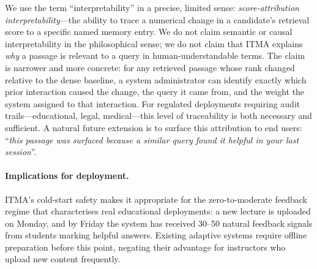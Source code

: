 \documentclass[preprint,12pt]{elsarticle}
\begin{document}
We use the term ``interpretability'' in a precise, limited sense:
\emph{score-attribution interpretability}---the ability to trace a numerical
change in a candidate's retrieval score to a specific named memory entry.  We
do not claim semantic or causal interpretability in the philosophical sense; we
do not claim that ITMA explains \emph{why} a passage is relevant to a query in
human-understandable terms.  The claim is narrower and more concrete: for any
retrieved passage whose rank changed relative to the dense baseline, a system
administrator can identify exactly which prior interaction caused the change,
the query it came from, and the weight the system assigned to that interaction.
For regulated deployments requiring audit trails---educational, legal,
medical---this level of traceability is both necessary and sufficient.  A
natural future extension is to surface this attribution to end users:
``\emph{this passage was surfaced because a similar query found it helpful in
your last session}''.

\paragraph{Implications for deployment.}
ITMA's cold-start safety makes it appropriate for the zero-to-moderate
feedback regime that characterises real educational deployments: a new
lecture is uploaded on Monday, and by Friday the system has received 30--50
natural feedback signals from students marking helpful answers.  Existing
adaptive systems require offline preparation before this point, negating
their advantage for instructors who upload new content frequently.
\end{document}
